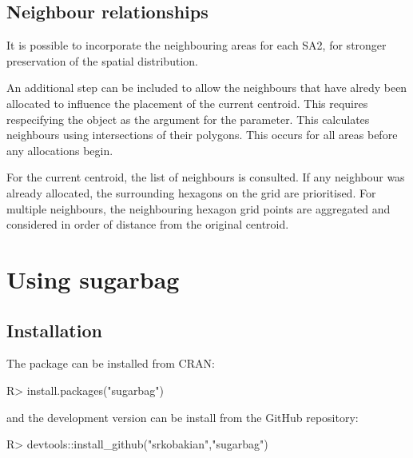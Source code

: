 \documentclass[
]{jss}
\begin{document}
\hypertarget{neighbour-relationships}{%
\subsection{Neighbour relationships}\label{neighbour-relationships}}

It is possible to incorporate the neighbouring areas for each SA2, for
stronger preservation of the spatial distribution.

An additional step can be included to allow the neighbours that have
alredy been allocated to influence the placement of the current
centroid. This requires respecifying the  object as the
argument for the  parameter. This calculates
neighbours using intersections of their polygons. This occurs for all
areas before any allocations begin.

For the current centroid, the list of neighbours is consulted. If any
neighbour was already allocated, the surrounding hexagons on the grid
are prioritised. For multiple neighbours, the neighbouring hexagon grid
points are aggregated and considered in order of distance from the
original centroid.

\hypertarget{using-sugarbag}{%
\section{Using sugarbag}\label{using-sugarbag}}

\hypertarget{installation}{%
\subsection{Installation}\label{installation}}

The package can be installed from CRAN:

\begin{CodeChunk}

\begin{CodeInput}
R> install.packages("sugarbag")
\end{CodeInput}
\end{CodeChunk}

and the development version can be install from the GitHub repository:

\begin{CodeChunk}

\begin{CodeInput}
R> devtools::install_github("srkobakian","sugarbag")
\end{CodeInput}
\end{CodeChunk}
\end{document}
